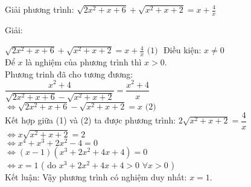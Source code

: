 \begin{vd}
  Giải phương trình: $ \sqrt{2x^2 +x +6} + \sqrt{x^2 +x +2} = x + \frac{4}{x } $
\end{vd}
\begin{center}
    Giải:
\end{center}
$\sqrt{2x^2 +x +6} + \sqrt{x^2 +x +2} = x + \frac{4}{x } \text{ (1) }$
Điều kiện: $ x \neq 0  $ \\
Để $x$ là nghiệm của phương trình thì $x >0$. \\
Phương trinh đã cho tương đương:\\
$     \dfrac{x^2 +4}{\sqrt{2x^2 +x +6} - \sqrt{x^2 +x +2}} =     \dfrac{x^2 +4}{x}  $ \\
$ \Leftrightarrow \sqrt{2x^2 +x +6} - \sqrt{x^2 +x +2} = x \text{ (2) }$ \\
Kết hợp giữa (1) và (2) ta được phương trình: $ 2     \sqrt{x^2+x +2 } =     \dfrac{4}{x } $ \\
$ \Leftrightarrow x \sqrt{x^2 +x +2 } = 2 $ \\
$  \Leftrightarrow x^4 + x^3 + 2x^2 -4 =0 $ \\
$ \Leftrightarrow (x-1)( x^3 +2x^2 +4x +4) =0 $ \\
$ \Leftrightarrow x = 1 $ ( do $ x^3 +2x^2 +4x +4 > 0$  $  \forall x >0 $ ) \\
Kết luận: Vậy phương trình có nghiệm duy nhất: $ x=1 $.
